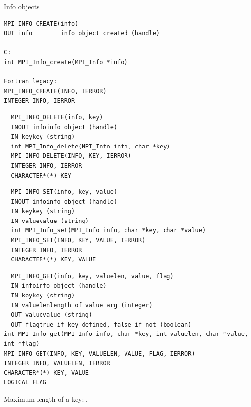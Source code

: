 
\lstset{style=reviewcode,language=C}
 {Info objects}
\label{sec:mpi:info}

\begin{verbatim}
MPI_INFO_CREATE(info)
OUT info        info object created (handle)

C:
int MPI_Info_create(MPI_Info *info)

Fortran legacy:
MPI_INFO_CREATE(INFO, IERROR)
INTEGER INFO, IERROR 
\end{verbatim}

\begin{verbatim}
  MPI_INFO_DELETE(info, key)
  INOUT infoinfo object (handle)
  IN keykey (string)
  int MPI_Info_delete(MPI_Info info, char *key)
  MPI_INFO_DELETE(INFO, KEY, IERROR)
  INTEGER INFO, IERROR
  CHARACTER*(*) KEY
\end{verbatim}

\begin{verbatim}
  MPI_INFO_SET(info, key, value)
  INOUT infoinfo object (handle)
  IN keykey (string)
  IN valuevalue (string)
  int MPI_Info_set(MPI_Info info, char *key, char *value)
  MPI_INFO_SET(INFO, KEY, VALUE, IERROR)
  INTEGER INFO, IERROR
  CHARACTER*(*) KEY, VALUE
\end{verbatim}

\begin{verbatim}
  MPI_INFO_GET(info, key, valuelen, value, flag)
  IN infoinfo object (handle)
  IN keykey (string)
  IN valuelenlength of value arg (integer)
  OUT valuevalue (string)
  OUT flagtrue if key defined, false if not (boolean)
int MPI_Info_get(MPI_Info info, char *key, int valuelen, char *value,
int *flag)
MPI_INFO_GET(INFO, KEY, VALUELEN, VALUE, FLAG, IERROR)
INTEGER INFO, VALUELEN, IERROR
CHARACTER*(*) KEY, VALUE
LOGICAL FLAG
\end{verbatim}

Maximum length of a key: .

